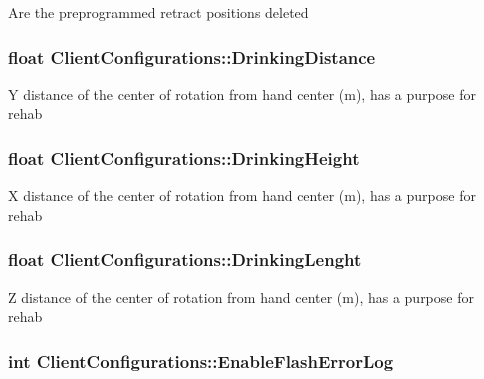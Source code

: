 Are the preprogrammed retract positions deleted \hypertarget{struct_client_configurations_a494c5a866ae44191aafdc66ab69033c3}{
\subsubsection[{Drinking\-Distance}]{\setlength{\rightskip}{0pt plus 5cm}float Client\-Configurations\-::\-Drinking\-Distance}}\label{struct_client_configurations_a494c5a866ae44191aafdc66ab69033c3}
Y distance of the center of rotation from hand center (m), has a purpose for rehab \hypertarget{struct_client_configurations_a05043c8fe2f31f3c216a97edc2411664}{
\subsubsection[{Drinking\-Height}]{\setlength{\rightskip}{0pt plus 5cm}float Client\-Configurations\-::\-Drinking\-Height}}\label{struct_client_configurations_a05043c8fe2f31f3c216a97edc2411664}
X distance of the center of rotation from hand center (m), has a purpose for rehab \hypertarget{struct_client_configurations_a1029013b8d5d2d9ea902ab628c98a7e0}{
\subsubsection[{Drinking\-Lenght}]{\setlength{\rightskip}{0pt plus 5cm}float Client\-Configurations\-::\-Drinking\-Lenght}}\label{struct_client_configurations_a1029013b8d5d2d9ea902ab628c98a7e0}
Z distance of the center of rotation from hand center (m), has a purpose for rehab \hypertarget{struct_client_configurations_a16b087061d560a4f185e779352d6e2e3}{
\subsubsection[{Enable\-Flash\-Error\-Log}]{\setlength{\rightskip}{0pt plus 5cm}int Client\-Configurations\-::\-Enable\-Flash\-Error\-Log}}\label{struct_client_configurations_a16b087061d560a4f185e779352d6e2e3}

